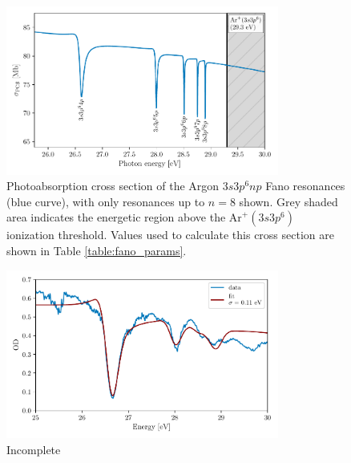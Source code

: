 \begin{figure}
	\centering
	\includegraphics[width=0.8\textwidth]{figures/ATS/fano_GS.pdf}
	\caption[Photoabsorption cross section of the Argon $3s3p^6np$ Fano resonances]{Photoabsorption cross section of the Argon $3s3p^6np$ Fano resonances (blue curve), with only resonances up to $n=8$ shown.  Grey shaded area indicates the energetic region above the $\mathrm{Ar}^+(3s3p^6)$ ionization threshold. Values used to calculate this cross section are shown in Table \ref{table:fano_params}.}
	\label{fig:fano_gs_pcs}
\end{figure}

\begin{figure}
	\centering
	\includegraphics[width=0.8\textwidth]{figures/ATS/fano_fit.pdf}
	\caption{Incomplete}
	\label{fig:fano_fit}
\end{figure}


